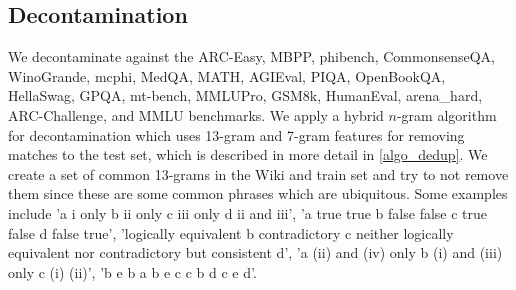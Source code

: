 \documentclass[11pt]{article}
\begin{document}
\subsection{Decontamination}
We decontaminate against the ARC-Easy, MBPP, phibench, CommonsenseQA, WinoGrande, mcphi, MedQA, MATH, AGIEval, PIQA, OpenBookQA, HellaSwag, GPQA, mt-bench, MMLUPro, GSM8k, HumanEval, arena\_hard, ARC-Challenge, and MMLU benchmarks.
We apply a hybrid $n$-gram algorithm for decontamination which uses 13-gram and 7-gram features for removing matches to the test set, which is described in more detail in \ref{algo_dedup}.
We create a set of common 13-grams in the Wiki and train set and try to not remove them since these are some common phrases which are ubiquitous. 
Some examples include 'a i only b ii only c iii only d ii and iii', 'a true true b false false c true false d false true', 'logically equivalent b contradictory c neither logically equivalent nor contradictory but consistent d', 'a (ii) and (iv) only b (i) and (iii) only c (i) (ii)', 'b e b a b e c c b d c e d'.
\end{document}
